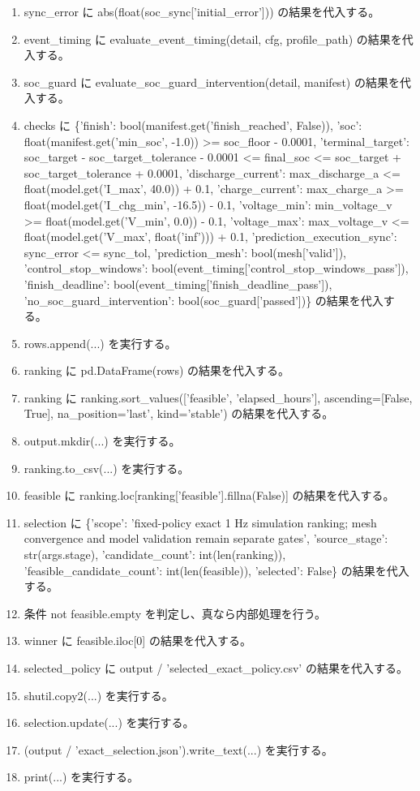 \documentclass[a4paper,11pt]{article}
\begin{document}
\begin{enumerate}[leftmargin=1.8em]
\item   sync\_error に abs(float(soc\_sync['initial\_error'])) の結果を代入する。
\item   event\_timing に evaluate\_event\_timing(detail, cfg, profile\_path) の結果を代入する。
\item   soc\_guard に evaluate\_soc\_guard\_intervention(detail, manifest) の結果を代入する。
\item   checks に \{'finish': bool(manifest.get('finish\_reached', False)), 'soc': float(manifest.get('min\_soc', -1.0)) >= soc\_floor - 0.0001, 'terminal\_target': soc\_target - soc\_target\_tolerance - 0.0001 <= final\_soc <= soc\_target + soc\_target\_tolerance + 0.0001, 'discharge\_current': max\_discharge\_a <= float(model.get('I\_max', 40.0)) + 0.1, 'charge\_current': max\_charge\_a >= float(model.get('I\_chg\_min', -16.5)) - 0.1, 'voltage\_min': min\_voltage\_v >= float(model.get('V\_min', 0.0)) - 0.1, 'voltage\_max': max\_voltage\_v <= float(model.get('V\_max', float('inf'))) + 0.1, 'prediction\_execution\_sync': sync\_error <= sync\_tol, 'prediction\_mesh': bool(mesh['valid']), 'control\_stop\_windows': bool(event\_timing['control\_stop\_windows\_pass']), 'finish\_deadline': bool(event\_timing['finish\_deadline\_pass']), 'no\_soc\_guard\_intervention': bool(soc\_guard['passed'])\} の結果を代入する。
\item   rows.append(...) を実行する。
\item ranking に pd.DataFrame(rows) の結果を代入する。
\item ranking に ranking.sort\_values(['feasible', 'elapsed\_hours'], ascending=[False, True], na\_position='last', kind='stable') の結果を代入する。
\item output.mkdir(...) を実行する。
\item ranking.to\_csv(...) を実行する。
\item feasible に ranking.loc[ranking['feasible'].fillna(False)] の結果を代入する。
\item selection に \{'scope': 'fixed-policy exact 1 Hz simulation ranking; mesh convergence and model validation remain separate gates', 'source\_stage': str(args.stage), 'candidate\_count': int(len(ranking)), 'feasible\_candidate\_count': int(len(feasible)), 'selected': False\} の結果を代入する。
\item 条件 not feasible.empty を判定し、真なら内部処理を行う。
\item   winner に feasible.iloc[0] の結果を代入する。
\item   selected\_policy に output / 'selected\_exact\_policy.csv' の結果を代入する。
\item   shutil.copy2(...) を実行する。
\item   selection.update(...) を実行する。
\item (output / 'exact\_selection.json').write\_text(...) を実行する。
\item print(...) を実行する。
            \end{enumerate}
\end{document}
